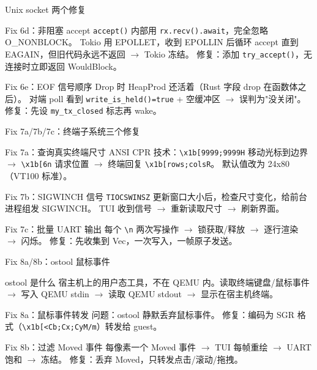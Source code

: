 \documentclass{beamer}
\begin{document}
\begin{frame}{Unix socket 两个修复}
  \begin{block}{Fix 6d：非阻塞 accept}
    \texttt{accept()} 内部用 \texttt{rx.recv().await}，完全忽略 O\_NONBLOCK。
    Tokio 用 EPOLLET，收到 EPOLLIN 后循环 accept 直到 EAGAIN，但旧代码永远不返回 $\to$ Tokio 冻结。
    修复：添加 \texttt{try\_accept()}，无连接时立即返回 WouldBlock。
  \end{block}
  \begin{block}{Fix 6e：EOF 信号顺序}
    Drop 时 HeapProd 还活着（Rust 字段 drop 在函数体之后）。
    对端 poll 看到 \texttt{write\_is\_held()=true} + 空缓冲区 $\to$ 误判为"没关闭"。
    修复：先设 \texttt{my\_tx\_closed} 标志再 wake。
  \end{block}
\end{frame}


\begin{frame}{Fix 7a/7b/7c：终端子系统三个修复}
  \begin{block}{Fix 7a：查询真实终端尺寸}
    ANSI CPR 技术：\texttt{\textbackslash x1b[9999;9999H} 移动光标到边界 $\to$
    \texttt{\textbackslash x1b[6n} 请求位置 $\to$ 终端回复 \texttt{\textbackslash x1b[rows;colsR}。
    默认值改为 24x80（VT100 标准）。
  \end{block}
  \begin{block}{Fix 7b：SIGWINCH 信号}
    \texttt{TIOCSWINSZ} 更新窗口大小后，检查尺寸变化，给前台进程组发 SIGWINCH。
    TUI 收到信号 $\to$ 重新读取尺寸 $\to$ 刷新界面。
  \end{block}
  \begin{block}{Fix 7c：批量 UART 输出}
    每个 \texttt{\textbackslash n} 两次写操作 $\to$ 锁获取/释放 $\to$ 逐行渲染 $\to$ 闪烁。
    修复：先收集到 Vec，一次写入，一帧原子发送。
  \end{block}
\end{frame}


\begin{frame}{Fix 8a/8b：ostool 鼠标事件}
  \begin{block}{ostool 是什么}
    宿主机上的用户态工具，不在 QEMU 内。读取终端键盘/鼠标事件 $\to$ 写入 QEMU stdin $\to$
    读取 QEMU stdout $\to$ 显示在宿主机终端。
  \end{block}
  \begin{block}{Fix 8a：鼠标事件转发}
    问题：ostool 静默丢弃鼠标事件。
    修复：编码为 SGR 格式（\texttt{\textbackslash x1b[<Cb;Cx;CyM/m}）转发给 guest。
  \end{block}
  \begin{block}{Fix 8b：过滤 Moved 事件}
    每像素一个 Moved 事件 $\to$ TUI 每帧重绘 $\to$ UART 饱和 $\to$ 冻结。
    修复：丢弃 Moved，只转发点击/滚动/拖拽。
  \end{block}
\end{frame}
\end{document}
